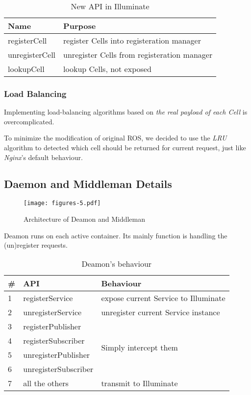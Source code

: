 \begin{table}[H]
  \caption{New API in Illuminate}
  \label{table:illuminate-api}
  \centering
  \begin{tabular}{ll}
    \hline
    \bfseries Name & \bfseries Purpose \\
    \hline
    registerCell   & register Cells into registeration manager  \\
    unregisterCell & unregister Cells from registeration manager \\
    lookupCell     & lookup Cells, not exposed \\
    \hline
  \end{tabular}
\end{table} 



\subsubsection{Load Balancing}
Implementing load-balancing algorithms based on \emph{the real payload of each Cell} is overcomplicated.

To minimize the modification of original ROS, we decided to use the \emph{LRU} algorithm to detected which cell should be returned for current request, just like \emph{Nginx}'s default behaviour.

\subsection{Daemon and Middleman Details}

\begin{figure}[!t]
\centering
\texttt{[image: figures-5.pdf]}
\caption{Architecture of Deamon and Middleman}
\label{figure:aodm}
\end{figure}

Deamon runs on each active container.
Its mainly function is handling the (un)register requests.
\begin{table}[H]
  \renewcommand{\arraystretch}{1.3}
  \caption{Deamon's behaviour}
  \label{table:demans-behaviour}
  \centering
  \begin{tabular}{|l|l|l|}
     \hline
     \bfseries \# & \bfseries API & \bfseries Behaviour \\
     \hline
     1 & registerService & expose current Service to Illuminate\\
     \hline
     2 & unregisterService & unregister current Service instance \\
     \hline
     3 & registerPublisher & \multirow{4}{*}{Simply intercept them} \\
     \cline{1-2}
     4 & registerSubscriber    &  \\
     \cline{1-2}
     5 & unregisterPublisher   &  \\
     \cline{1-2}
     6 & unregisterSubscriber  &  \\
     \hline
     7 & all the others & transmit to Illuminate \\
     \hline
  \end{tabular}
\end{table}

